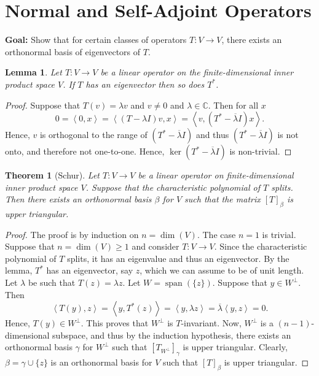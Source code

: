 \documentclass[12pt]{article}
\DeclareMathOperator{\spn}{span}
\newcommand{\tv}{T:V\rightarrow V}
\newcommand{\indot}[1]{\left\langle #1 \right\rangle}
\newtheorem{theorem}{Theorem}[section]
\newtheorem{lemma}{Lemma}[section]
\theoremstyle{definition}
\begin{document}
\section{Normal and Self-Adjoint Operators}

\textbf{Goal:}  Show that for certain classes of operators $\tv$, there exists an orthonormal basis of eigenvectors of $T$.  

\begin{lemma}
Let $\tv$ be a linear operator on the finite-dimensional inner product space $V$.  If $T$ has an eigenvector then so does $T^*$.
\end{lemma}
\begin{proof}
Suppose that $T(v)=\lambda v$ and $v\neq 0$ and $\lambda\in\mathbb{C}$.  Then for all $x$
\[
0=\indot{0,x} = \indot{(T-\lambda I)v,x} = \indot{v,(T^*-\overline{\lambda}I) x}. 
\]
Hence, $v$ is orthogonal to the range of $(T^*-\overline{\lambda}I)$ and thus $(T^*-\overline{\lambda} I)$ is not onto, and therefore not one-to-one.  Hence, $\ker(T^*-\overline{\lambda} I)$ is non-trivial.
\end{proof}

\begin{theorem}[Schur]
Let $\tv$ be a linear operator on finite-dimensional inner product space $V$.  Suppose that the characteristic polynomial of $T$ splits.  Then there exists an orthonormal basis $\beta$ for $V$ such that the matrix $[T]_\beta$ is upper triangular.
\end{theorem}

\begin{proof}
The proof is by induction on $n=\dim(V)$.  The case $n=1$ is trivial.  Suppose that $n=\dim(V)\geq 1$ and consider $\tv$.  Since the characteristic polynomial of $T$ splits, it has an eigenvalue and thus an eigenvector.  By the lemma, $T^*$ has an eigenvector, say $z$, which we can assume to be of unit length.  Let $\lambda$ be such that $T(z)=\lambda z$.  Let $W=\spn(\{z\})$.  Suppose that $y\in W^\perp$.  Then
\[
\indot{T(y),z} = \indot{y,T^*(z)} = \indot{y,\lambda z} = \overline{\lambda} \indot{y,z}=0.
\]  
Hence, $T(y)\in W^\perp$.  This proves that $W^\perp$ is $T$-invariant.  Now, $W^\perp$ is a $(n-1)$-dimensional subspace, and thus by the induction hypothesis, there exists an orthonormal basis $\gamma$ for $W^\perp$ such that $[T_{W^\perp}]_{\gamma}$ is upper triangular.  Clearly, $\beta=\gamma\cup\{z\}$ is an orthonormal basis for $V$ such that $[T]_\beta$ is upper triangular. 
\end{proof}
\end{document}
